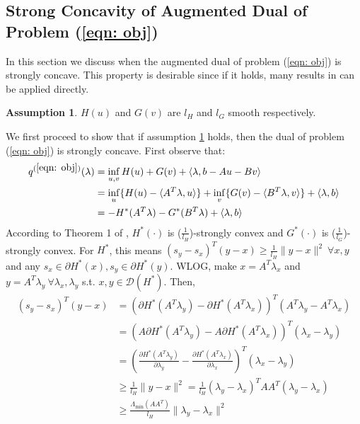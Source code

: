 \documentclass[11pt]{article}
\theoremstyle{plain}
\theoremstyle{definition}
\newtheorem{assumption}{Assumption}
\theoremstyle{remark}
\begin{document}
\subsection{Strong Concavity of Augmented Dual of Problem (\ref{eqn: obj})}
\label{subsec:cvx_augdual}
In this section we discuss when the augmented dual of problem (\ref{eqn: obj}) is strongly concave. This property is desirable since if it holds, many results in \cite{cyrus2018robust} can be applied directly. 

\begin{assumption}
	$H(u)$ and $G(v)$ are $l_H$ and $l_G$ smooth respectively.
	\label{assump:smooth_obj}
\end{assumption}

We first proceed to show that if assumption \ref{assump:smooth_obj} holds, then the dual of problem (\ref{eqn: obj}) is strongly concave. First observe that:
\begin{equation}
	\begin{aligned}
		q^{(\ref{eqn: obj})}(\lambda) &= \inf_{u,v} H(u)+G(v)+\langle \lambda, b-Au-Bv \rangle \\
		&= \inf_u \{H(u)-\langle A^T\lambda, u\rangle \} + \inf_v \{G(v)-\langle B^T\lambda, v\rangle \} + \langle \lambda, b \rangle \\
		&= -H^*(A^T\lambda) - G^*(B^T \lambda) + \langle \lambda, b \rangle
	\end{aligned}
\end{equation}
According to Theorem 1 of \cite{zhou2018fenchel}, $H^*(\cdot)$ is ($\frac{1}{l_H}$)-strongly convex and $G^*(\cdot)$ is ($\frac{1}{l_G}$)-strongly convex. For $H^*$, this means $(s_y - s_x)^T(y-x) \geq \frac{1}{l_H}\|y-x\|^2 \ \forall x, y$ and any $s_x \in \partial H^*(x), s_y \in \partial H^*(y)$. WLOG, make $x=A^T \lambda_x$ and $y = A^T \lambda_y \ \forall \lambda_x, \lambda_y$ s.t. $x,y \in \mathcal{D}(H^*)$. Then,
\begin{equation}
	\begin{aligned}
		(s_y - s_x)^T(y-x) &= (\partial H^*(A^T \lambda_y) - \partial H^*(A^T \lambda_x))^T (A^T\lambda_y - A^T \lambda_x) \\
		&= (A\partial H^*(A^T \lambda_y) - A\partial H^*(A^T \lambda_x))^T(\lambda_x - \lambda_y) \\
		&= (\frac{\partial H^*(A^T \lambda_y)}{\partial \lambda_y} - \frac{\partial H^*(A^T \lambda_x)}{\partial \lambda_x})^T(\lambda_x - \lambda_y) \\
		&\geq \frac{1}{l_H}\|y-x\|^2 = \frac{1}{l_H} (\lambda_y - \lambda_x)^TAA^T(\lambda_y - \lambda_x) \\
		&\geq \frac{\Lambda_{\text{min}}(AA^T)}{l_H} \|\lambda_y - \lambda_x\|^2
	\end{aligned}
\end{equation}
\end{document}
